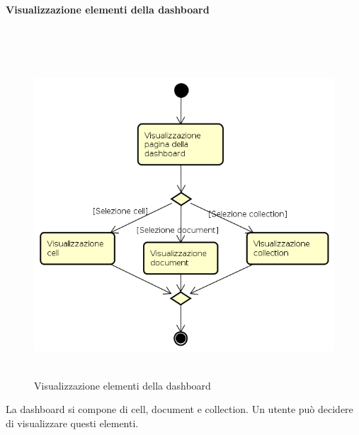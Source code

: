\paragraph{Visualizzazione elementi della dashboard} \mbox{} \\
\begin{figure}[H]
\begin{center}
\includegraphics[height=12cm]{res/sections/backend/activities/visualizzazioneElementDashboard.png}
\caption{Visualizzazione elementi della dashboard}
\end{center}
\end{figure}
La dashboard si compone di cell, document e collection. Un utente può decidere di visualizzare questi elementi.
